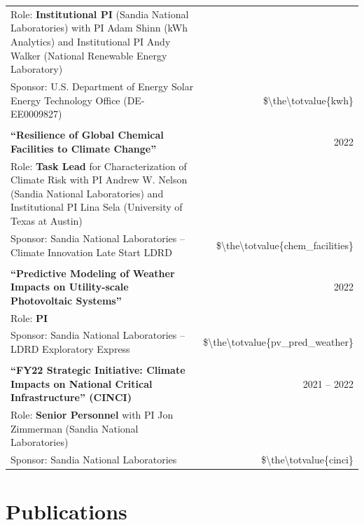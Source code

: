 \documentclass{article}[12pt]
\begin{document}
\begin{tabularx}{\textwidth}{Xr}
			Role: \textbf{Institutional PI} (Sandia National Laboratories) with PI Adam Shinn (kWh Analytics) and Institutional PI Andy Walker (National Renewable Energy Laboratory) & \\
			Sponsor: U.S. Department of Energy Solar Energy Technology Office  (DE-EE0009827) & \$\num{\the\totvalue{kwh}} 
			\\
			\\
			\textbf{``Resilience of Global Chemical Facilities to Climate Change'' } & 2022 \\
			Role: \textbf{Task Lead} for Characterization of Climate Risk with PI Andrew W. Nelson (Sandia National Laboratories) and Institutional PI Lina Sela (University of Texas at Austin) & \\ 
			Sponsor: Sandia National Laboratories -- Climate Innovation Late Start LDRD & \$\num{\the\totvalue{chem_facilities}}  
			\\
			\\
			\textbf{``Predictive Modeling of Weather Impacts on Utility-scale Photovoltaic Systems'' } & 2022 \\
			Role: \textbf{PI} & \\ 
			Sponsor: Sandia National Laboratories -- LDRD Exploratory Express & \$\num{\the\totvalue{pv_pred_weather}} 
			\\
			\\
			\textbf{``FY22 Strategic Initiative: Climate Impacts on National Critical Infrastructure'' (CINCI)} & 2021 -- 2022 \\
			Role: \textbf{Senior Personnel} with PI Jon Zimmerman (Sandia National Laboratories) & \\ 
			Sponsor: Sandia National Laboratories & \$\num{\the\totvalue{cinci}} 
			
		\end{tabularx}
		
		
		
		
		\section*{Publications}
		
\end{document}
